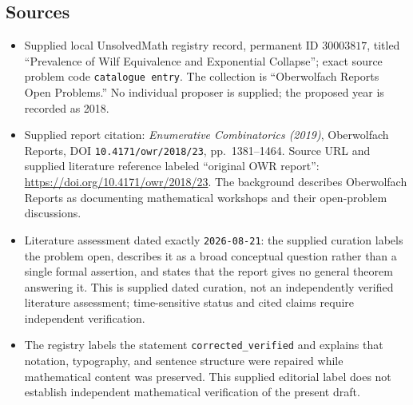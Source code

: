\documentclass[11pt]{article}
\begin{document}
\subsection{Sources}
\begin{itemize}
\item Supplied local UnsolvedMath registry record, permanent ID \(30003817\), titled ``Prevalence of Wilf Equivalence and Exponential Collapse''; exact source problem code \texttt{catalogue entry}. The collection is ``Oberwolfach Reports Open Problems.'' No individual proposer is supplied; the proposed year is recorded as 2018.
\item Supplied report citation: \emph{Enumerative Combinatorics (2019)}, Oberwolfach Reports, DOI \texttt{10.4171/owr/2018/23}, pp.~1381--1464. Source URL and supplied literature reference labeled ``original OWR report'': \url{https://doi.org/10.4171/owr/2018/23}. The background describes Oberwolfach Reports as documenting mathematical workshops and their open-problem discussions.
\item Literature assessment dated exactly \texttt{2026-08-21}: the supplied curation labels the problem open, describes it as a broad conceptual question rather than a single formal assertion, and states that the report gives no general theorem answering it. This is supplied dated curation, not an independently verified literature assessment; time-sensitive status and cited claims require independent verification.
\item The registry labels the statement \texttt{corrected\_verified} and explains that notation, typography, and sentence structure were repaired while mathematical content was preserved. This supplied editorial label does not establish independent mathematical verification of the present draft.
\end{itemize}
\end{document}
